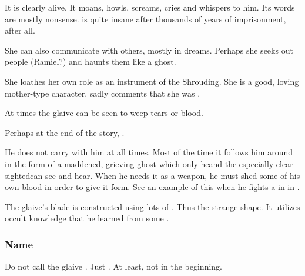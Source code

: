 It is clearly alive. 
It moans, howls, screams, cries and whispers to him. 
Its words are mostly nonsense. 
\Triestessakhin{} is quite insane after thousands of years of imprisonment, after all. 

She can also communicate with others, mostly in dreams. 
Perhaps she seeks out people (Ramiel?) and haunts them like a ghost. 

She loathes her own role as an instrument of the Shrouding. 
She is a good, loving mother-type character. 
\Ishnaruchaefir{} sadly comments that she was .

At times the glaive can be seen to weep tears or blood.

Perhaps at the end of the story, . 

He does not carry \Triestessakhin{} with him at all times. 
Most of the time it follows him around in the form of a maddened, grieving ghost which only he\dash and the especially clear-sighted\dash can see and hear. 
When he needs it as a weapon, he must shed some of his own blood in order to give it form. 
See an example of this {when he fights a \ghobal{} in \Malcur} in \TwilightAngelRememberEmph.

The glaive's blade is constructed using lots of . 
Thus the strange shape. 
It utilizes occult knowledge that he learned from some . 





\subsubsection{Name}
Do not call the glaive \quo{\Rystessakhin}. 
Just .
At least, not in the beginning. 





